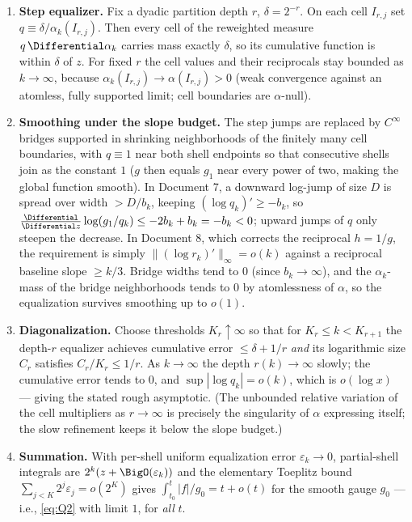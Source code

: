 \documentclass[11pt,oneside]{article}
\theoremstyle{definition}
\theoremstyle{remark}
\begin{document}
\begin{enumerate}
\item \textbf{Step equalizer.}  Fix a dyadic partition depth $r$,
$\delta=2^{-r}$.  On each cell $I_{r,j}$ set
$q\equiv\delta/\alpha_k(I_{r,j})$.  Then every cell of the reweighted
measure $q\,\Differential\alpha_k$ carries mass exactly $\delta$, so its
cumulative function is within $\delta$ of $z$.  For fixed $r$ the cell
values and their reciprocals stay bounded as $k\to\infty$, because
$\alpha_k(I_{r,j})\to\alpha(I_{r,j})>0$ (weak convergence against an
atomless, fully supported limit; cell boundaries are $\alpha$-null).
\item \textbf{Smoothing under the slope budget.}  The step jumps are
replaced by $C^\infty$ bridges supported in shrinking neighborhoods of
the finitely many cell boundaries, with $q\equiv1$ near both shell
endpoints so that consecutive shells join as the constant $1$ ($g$
then equals $g_1$ near every power of two, making the global function
smooth).  In Document 7, a downward log-jump of size $D$ is spread over
width $>D/b_k$, keeping $(\log q_k)'\ge-b_k$, so
$\frac{\Differential}{\Differential z}\log(g_1/q_k)\le-2b_k+b_k=-b_k<0$; upward jumps of
$q$ only steepen the decrease.  In Document 8, which corrects the
reciprocal $h=1/g$, the requirement is simply
$\|(\log r_k)'\|_\infty=o(k)$ against a reciprocal baseline slope
$\ge k/3$.  Bridge widths tend to $0$ (since $b_k\to\infty$), and the
$\alpha_k$-mass of the bridge neighborhoods tends to $0$ by
atomlessness of $\alpha$, so the equalization survives smoothing up to
$o(1)$.
\item \textbf{Diagonalization.}  Choose thresholds $K_r\uparrow\infty$
so that for $K_r\le k<K_{r+1}$ the depth-$r$ equalizer achieves
cumulative error $\le\delta+1/r$ \emph{and} its logarithmic size $C_r$
satisfies $C_r/K_r\le1/r$.  As $k\to\infty$ the depth $r(k)\to\infty$
slowly; the cumulative error tends to $0$, and
$\sup|\log q_k|=o(k)$, which is $o(\log x)$ --- giving the stated rough
asymptotic.  (The unbounded relative variation of the cell multipliers
as $r\to\infty$ is precisely the singularity of $\alpha$ expressing
itself; the slow refinement keeps it below the slope budget.)
\item \textbf{Summation.}  With per-shell uniform equalization error
$\varepsilon_k\to0$, partial-shell integrals are $2^k(z+\BigO(\varepsilon_k))$
and the elementary Toeplitz bound
$\sum_{j<K}2^j\varepsilon_j=o(2^K)$ gives
$\int_{t_0}^t|f|/g_0=t+o(t)$ for the smooth gauge $g_0$ --- i.e.,
\eqref{eq:Q2} with limit $1$, for \emph{all} $t$.

\end{enumerate}
\end{document}
